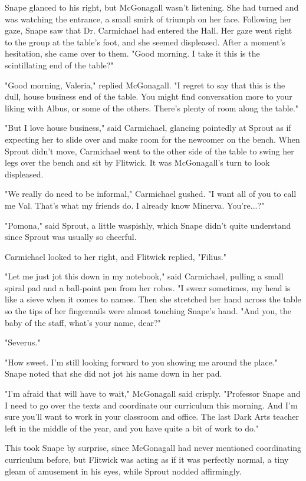 Snape glanced to his right, but McGonagall wasn't listening. She had turned and was watching the entrance, a small smirk of triumph on her face. Following her gaze, Snape saw that Dr. Carmichael had entered the Hall. Her gaze went right to the group at the table's foot, and she seemed displeased. After a moment's hesitation, she came over to them. "Good morning. I take it this is the scintillating end of the table?"

"Good morning, Valeria," replied McGonagall. "I regret to say that this is the dull, house business end of the table. You might find conversation more to your liking with Albus, or some of the others. There's plenty of room along the table."

"But I love house business," said Carmichael, glancing pointedly at Sprout as if expecting her to slide over and make room for the newcomer on the bench. When Sprout didn't move, Carmichael went to the other side of the table to swing her legs over the bench and sit by Flitwick. It was McGonagall's turn to look displeased.

"We really do need to be informal," Carmichael gushed. "I want all of you to call me Val. That's what my friends do. I already know Minerva. You're...?"

"Pomona," said Sprout, a little waspishly, which Snape didn't quite understand since Sprout was usually so cheerful.

Carmichael looked to her right, and Flitwick replied, "Filius."

"Let me just jot this down in my notebook," said Carmichael, pulling a small spiral pad and a ball-point pen from her robes. "I swear sometimes, my head is like a sieve when it comes to names. Then she stretched her hand across the table so the tips of her fingernails were almost touching Snape's hand. "And you, the baby of the staff, what's your name, dear?"

"Severus."

"How sweet. I'm still looking forward to you showing me around the place." Snape noted that she did not jot his name down in her pad.

"I'm afraid that will have to wait," McGonagall said crisply. "Professor Snape and I need to go over the texts and coordinate our curriculum this morning. And I'm sure you'll want to work in your classroom and office. The last Dark Arts teacher left in the middle of the year, and you have quite a bit of work to do."

This took Snape by surprise, since McGonagall had never mentioned coordinating curriculum before, but Flitwick was acting as if it was perfectly normal, a tiny gleam of amusement in his eyes, while Sprout nodded affirmingly.

